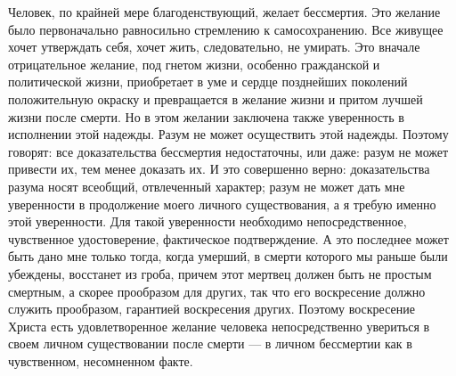 \documentclass[12pt,oneside]{book}
\begin{document}
Человек, по крайней мере благоденствующий, желает бессмертия. Это желание было первоначально равносильно стремлению к самосохранению. Все живущее хочет утверждать себя, хочет жить, следовательно, не умирать. Это вначале отрицательное желание, под гнетом жизни, особенно гражданской и политической жизни, приобретает в уме и сердце позднейших поколений положительную окраску и превращается в желание жизни и притом лучшей жизни после смерти. Но в этом желании заключена также уверенность в исполнении этой надежды. Разум не может осуществить этой надежды. Поэтому говорят: все доказательства бессмертия недостаточны, или даже: разум не может привести их, тем менее доказать их. И это совершенно верно: доказательства разума носят всеобщий, отвлеченный характер; разум не может дать мне уверенности в продолжение моего личного существования, а я требую именно этой уверенности. Для такой уверенности необходимо непосредственное, чувственное удостоверение, фактическое подтверждение. А это последнее может быть дано мне только тогда, когда умерший, в смерти которого мы раньше были убеждены, восстанет из гроба, причем этот мертвец должен быть не простым смертным, а скорее прообразом для других, так что его воскресение должно служить прообразом, гарантией воскресения других. Поэтому воскресение Христа есть удовлетворенное желание человека непосредственно увериться в своем личном существовании после смерти --- в личном бессмертии как в чувственном, несомненном факте.
\end{document}

